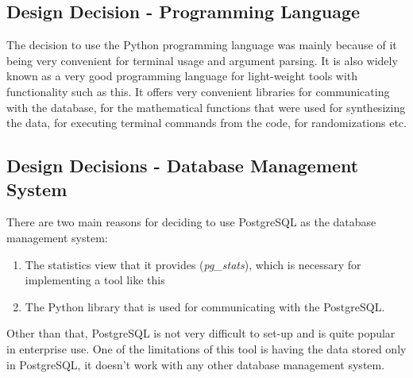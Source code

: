 \subsection{Design Decision - Programming Language}
The decision to use the Python programming language was mainly because of it being very convenient for terminal usage and argument parsing. It is also widely known as a very good programming language for light-weight tools with functionality such as this. It offers very convenient libraries for communicating with the database, for the mathematical functions that were used for synthesizing the data, for executing terminal commands from the code, for randomizations etc.
\subsection{Design Decisions - Database Management System}
There are two main reasons for deciding to use PostgreSQL as the database management system: 
\begin{enumerate}
\item{The statistics view that it provides (\textit{pg\_stats}), which is necessary for implementing a tool like this}
\item{The Python library that is used for communicating with the PostgreSQL.}
\end{enumerate}
Other than that, PostgreSQL is not very difficult to set-up and is quite popular in enterprise use. One of the limitations of this tool is having the data stored only in PostgreSQL, it doesn't work with any other database management system.

\newpage
